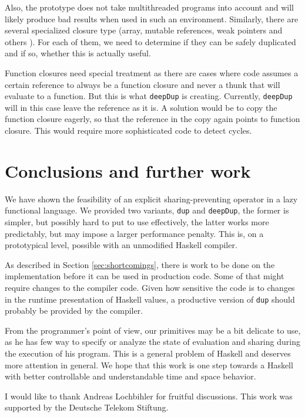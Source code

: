 \documentclass[preprint]{sigplanconf}
\theoremstyle{nonumberplain}
\newcommand{\li}{\lstinline[style=Haskell]}
\begin{document}

Also, the prototype does not take multithreaded programs into account and will likely produce bad results when used in such an environment. Similarly, there are several specialized closure type (array, mutable references, weak pointers and others \citep[page HeapObjects]{commentary}). For each of them, we need to determine if they can be safely duplicated and if so, whether this is actually useful.

Function closures need special treatment as there are cases where code assumes a certain reference to always be a function closure and never a thunk that will evaluate to a function. But this is what \li-deepDup- is creating. Currently, \li-deepDup- will in this case leave the reference as it is. A solution would be to copy the function closure eagerly, so that the reference in the copy again points to function closure. This would require more sophisticated code to detect cycles. 

\section{Conclusions and further work}

We have shown the feasibility of an explicit sharing-preventing operator in a lazy functional language. We provided two variants, \li-dup- and \li-deepDup-, the former is simpler, but possibly hard to put to use effectively, the latter works more predictably, but may impose a larger performance penalty. This is, on a prototypical level, possible with an unmodified Haskell compiler.

As described in Section \ref{sec:shortcomings}, there is work to be done on the implementation before it can be used in production code. Some of that might require changes to the compiler code. Given how sensitive the code is to changes in the runtime presentation of Haskell values, a productive version of \li-dup- should probably be provided by the compiler.

From the programmer’s point of view, our primitives may be a bit delicate to use, as he has few way to specify or analyze the state of evaluation and sharing during the execution of his program. This is a general problem of Haskell and deserves more attention in general. We hope that this work is one step towards a Haskell with better controllable and understandable time and space behavior.


\acks

I would like to thank Andreas Lochbihler for fruitful discussions. This work was supported by the Deutsche Telekom Stiftung.



\end{document}
